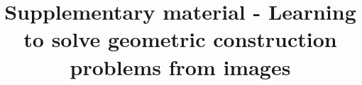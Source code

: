 \documentclass[runningheads]{llncs}
\begin{document}
\title{Supplementary material - Learning to solve geometric construction problems from images}

\end{document}
